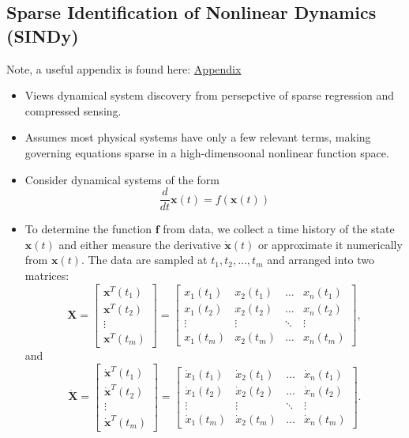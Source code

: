 \documentclass[12pt]{article}
\begin{document}
\subsection{Sparse Identification of Nonlinear Dynamics (SINDy)}
Note, a useful appendix is found here: \href{https://www.pnas.org/action/downloadSupplement?doi=10.1073%2Fpnas.1517384113&file=pnas.1517384113.sapp.pdf}{Appendix}
\begin{itemize}
    \item Views dynamical system discovery from persepctive of sparse regression and compressed sensing.
    \item Assumes most physical systems have only a few relevant terms, making governing equations sparse in a high-dimensoonal nonlinear function space.
    \item Consider dynamical systems of the form
        \[
            \frac{d}{dt}\bm{x}(t) = f(\bm{x}(t))
        \]
    \item To determine the function $\bm{f}$ from data, we collect a time history of the state $\bm{x}(t)$ and either measure the derivative $\dot{\bm{x}}(t)$ or approximate it numerically from $\bm{x}(t)$. The data are sampled at $t_1, t_2, \dots, t_m$ and arranged into two matrices:
        \[
            \bm{X} = \begin{bmatrix}\bm{x}^T(t_1)\\ \bm{x}^T(t_2)\\ \vdots \\ \bm{x}^T(t_m)\end{bmatrix} = \begin{bmatrix}x_1(t_1) & x_2(t_1) & \dots & x_n(t_1)\\ x_1(t_2) & x_2(t_2) & \dots & x_n(t_2)\\ \vdots & \vdots & \ddots & \vdots \\ x_1(t_m) & x_2(t_m) & \dots & x_n(t_m)\end{bmatrix},
        \] 
        and
         \[
             \bm{\dot{X}} = \begin{bmatrix}\bm{\dot{x}}^T(t_1)\\ \bm{\dot{x}}^T(t_2)\\ \vdots \\ \bm{\dot{x}}^T(t_m)\end{bmatrix} = \begin{bmatrix}\dot{x}_1(t_1) & \dot{x}_2(t_1) & \dots & \dot{x}_n(t_1)\\ \dot{x}_1(t_2) & \dot{x}_2(t_2) & \dots & \dot{x}_n(t_2)\\ \vdots & \vdots & \ddots & \vdots \\ \dot{x}_1(t_m) & \dot{x}_2(t_m) & \dots & \dot{x}_n(t_m)\end{bmatrix}.
\]
\end{itemize}
\end{document}

